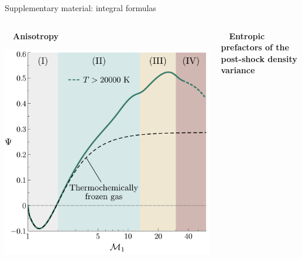 \documentclass[9pt, aspectratio=1609]{beamer}
\begin{document}
\begin{frame}{\large Supplementary material: integral formulas}
    \begin{columns}[c]
    \begin{column}{.45\textwidth}%
    \begin{center}
        \vspace{0.01cm}\textbf{$\quad$Anisotropy}\\ \vspace{0.3cm}
        
        \includegraphics[width=1\textwidth]{figures/huete2021/Anisotropy_AIAA2023.pdf}
    \end{center}
    \end{column}%
    \begin{column}{.45\textwidth}
    \begin{center}
        \vspace{-0.3cm}\textbf{$\quad$Entropic prefactors of the post-shock density variance}\\ \vspace{0.3cm}
        

\end{center}
\end{column}
\end{columns}
\end{frame}
\end{document}
